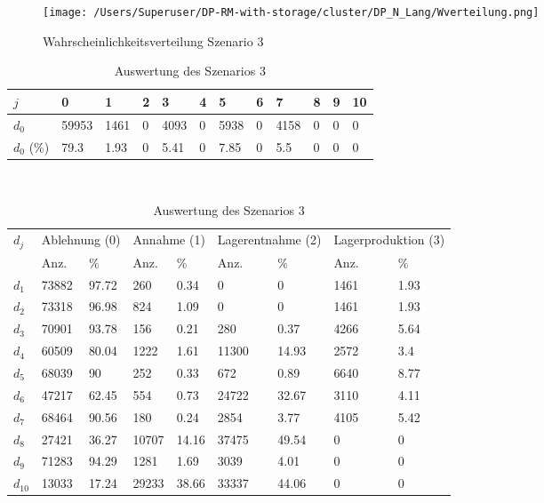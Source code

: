 \begin{figure}[h!]
  \begin{center}
    \texttt{[image: /Users/Superuser/DP-RM-with-storage/cluster/DP\_N\_Lang/Wverteilung.png]}
    \caption{Wahrscheinlichkeitsverteilung Szenario 3}  \label{SB3}
  \end{center}
\end{figure}

\begin{table}[h!]
\renewcommand{\arraystretch}{1.5}
  \begin{center}
    \caption{Auswertung des Szenarios 3}  \label{AS3}
    \vspace*{3mm}
    \begin{tabular}{l l l l l l l l l l l l }  \hline 
         $j$ & 0 & 1  & 2 & 3 & 4  & 5 & 6 & 7 & 8 & 9 & 10  \\  \hline
$d_{0}$ &  59953 &  1461 &  0 &  4093 &  0 &  5938 &  0 &  4158 &  0 &  0 &  0 \\
$d_{0}$ (\%)&   79.3 &  1.93 &  0 &  5.41 &  0 &  7.85 &  0 &   5.5 &  0 &  0 &  0 \\\hline
    \end{tabular} \\[3mm]
        \begin{tabular}{ l l l l l l l l l}   \hline    %
    $d_j$ & \multicolumn{2}{c}{Ablehnung (0)} & \multicolumn{2}{c}{Annahme (1)}  & \multicolumn{2}{c}{Lagerentnahme (2)} & \multicolumn{2}{c}{Lagerproduktion (3)}\\
    & Anz. & \% & Anz. & \% & Anz. & \% & Anz. & \% \\ \hline 
$d_{1}$  &  73882 &  97.72 &    260 &   0.34 &    0 &    0 &  1461 &  1.93 \\
$d_{2}$  &  73318 &  96.98 &    824 &   1.09 &    0 &    0 &  1461 &  1.93 \\
$d_{3}$  &  70901 &  93.78 &    156 &   0.21 &    280 &   0.37 &  4266 &  5.64 \\
$d_{4}$  &  60509 &  80.04 &   1222 &   1.61 &  11300 &  14.93 &  2572 &   3.4 \\
$d_{5}$  &  68039 &     90 &    252 &   0.33 &    672 &   0.89 &  6640 &  8.77 \\
$d_{6}$  &  47217 &  62.45 &    554 &   0.73 &  24722 &  32.67 &  3110 &  4.11 \\
$d_{7}$  &  68464 &  90.56 &    180 &   0.24 &   2854 &   3.77 &  4105 &  5.42 \\
$d_{8}$  &  27421 &  36.27 &  10707 &  14.16 &  37475 &  49.54 &   0 &   0 \\
$d_{9}$  &  71283 &  94.29 &   1281 &   1.69 &   3039 &   4.01 &   0 &   0 \\
$d_{10}$ &  13033 &  17.24 &  29233 &  38.66 &  33337 &  44.06 &   0 &   0 \\
          \hline
   \end{tabular} \\[3mm]
     \end{center}
\end{table}

